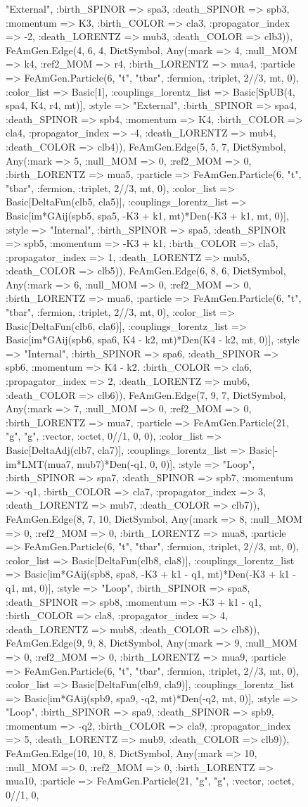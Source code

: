 \documentclass{revtex4}
\begin{document}
\begin{figure}[!htb]
\begin{center}
{"External", :birth_SPINOR => spa3, :death_SPINOR => spb3, :momentum => K3, :birth_COLOR => cla3, :propagator_index => -2, :death_LORENTZ => mub3, :death_COLOR => clb3)), FeAmGen.Edge(4, 6, 4, Dict{Symbol, Any}(:mark => 4, :null_MOM => k4, :ref2_MOM => r4, :birth_LORENTZ => mua4, :particle => FeAmGen.Particle(6, "t", "tbar", :fermion, :triplet, 2//3, mt, 0), :color_list => Basic[1], :couplings_lorentz_list => Basic[SpUB(4, spa4, K4, r4, mt)], :style => "External", :birth_SPINOR => spa4, :death_SPINOR => spb4, :momentum => K4, :birth_COLOR => cla4, :propagator_index => -4, :death_LORENTZ => mub4, :death_COLOR => clb4)), FeAmGen.Edge(5, 5, 7, Dict{Symbol, Any}(:mark => 5, :null_MOM => 0, :ref2_MOM => 0, :birth_LORENTZ => mua5, :particle => FeAmGen.Particle(6, "t", "tbar", :fermion, :triplet, 2//3, mt, 0), :color_list => Basic[DeltaFun(clb5, cla5)], :couplings_lorentz_list => Basic[im*GAij(spb5, spa5, -K3 + k1, mt)*Den(-K3 + k1, mt, 0)], :style => "Internal", :birth_SPINOR => spa5, :death_SPINOR => spb5, :momentum => -K3 + k1, :birth_COLOR => cla5, :propagator_index => 1, :death_LORENTZ => mub5, :death_COLOR => clb5)), FeAmGen.Edge(6, 8, 6, Dict{Symbol, Any}(:mark => 6, :null_MOM => 0, :ref2_MOM => 0, :birth_LORENTZ => mua6, :particle => FeAmGen.Particle(6, "t", "tbar", :fermion, :triplet, 2//3, mt, 0), :color_list => Basic[DeltaFun(clb6, cla6)], :couplings_lorentz_list => Basic[im*GAij(spb6, spa6, K4 - k2, mt)*Den(K4 - k2, mt, 0)], :style => "Internal", :birth_SPINOR => spa6, :death_SPINOR => spb6, :momentum => K4 - k2, :birth_COLOR => cla6, :propagator_index => 2, :death_LORENTZ => mub6, :death_COLOR => clb6)), FeAmGen.Edge(7, 9, 7, Dict{Symbol, Any}(:mark => 7, :null_MOM => 0, :ref2_MOM => 0, :birth_LORENTZ => mua7, :particle => FeAmGen.Particle(21, "g", "g", :vector, :octet, 0//1, 0, 0), :color_list => Basic[DeltaAdj(clb7, cla7)], :couplings_lorentz_list => Basic[-im*LMT(mua7, mub7)*Den(-q1, 0, 0)], :style => "Loop", :birth_SPINOR => spa7, :death_SPINOR => spb7, :momentum => -q1, :birth_COLOR => cla7, :propagator_index => 3, :death_LORENTZ => mub7, :death_COLOR => clb7)), FeAmGen.Edge(8, 7, 10, Dict{Symbol, Any}(:mark => 8, :null_MOM => 0, :ref2_MOM => 0, :birth_LORENTZ => mua8, :particle => FeAmGen.Particle(6, "t", "tbar", :fermion, :triplet, 2//3, mt, 0), :color_list => Basic[DeltaFun(clb8, cla8)], :couplings_lorentz_list => Basic[im*GAij(spb8, spa8, -K3 + k1 - q1, mt)*Den(-K3 + k1 - q1, mt, 0)], :style => "Loop", :birth_SPINOR => spa8, :death_SPINOR => spb8, :momentum => -K3 + k1 - q1, :birth_COLOR => cla8, :propagator_index => 4, :death_LORENTZ => mub8, :death_COLOR => clb8)), FeAmGen.Edge(9, 9, 8, Dict{Symbol, Any}(:mark => 9, :null_MOM => 0, :ref2_MOM => 0, :birth_LORENTZ => mua9, :particle => FeAmGen.Particle(6, "t", "tbar", :fermion, :triplet, 2//3, mt, 0), :color_list => Basic[DeltaFun(clb9, cla9)], :couplings_lorentz_list => Basic[im*GAij(spb9, spa9, -q2, mt)*Den(-q2, mt, 0)], :style => "Loop", :birth_SPINOR => spa9, :death_SPINOR => spb9, :momentum => -q2, :birth_COLOR => cla9, :propagator_index => 5, :death_LORENTZ => mub9, :death_COLOR => clb9)), FeAmGen.Edge(10, 10, 8, Dict{Symbol, Any}(:mark => 10, :null_MOM => 0, :ref2_MOM => 0, :birth_LORENTZ => mua10, :particle => FeAmGen.Particle(21, "g", "g", :vector, :octet, 0//1, 0, }
\end{center}
\end{figure}
\end{document}
